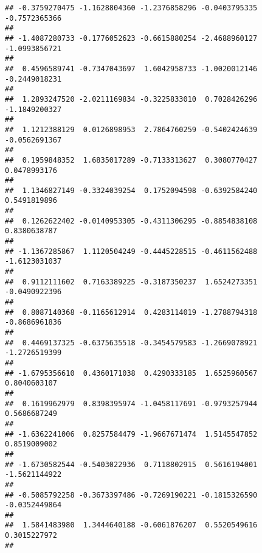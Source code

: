 \documentclass[]{article}
\begin{document}
\begin{verbatim}
## -0.3759270475 -1.1628804360 -1.2376858296 -0.0403795335 -0.7572365366 
##                                                                       
## -1.4087280733 -0.1776052623 -0.6615880254 -2.4688960127 -1.0993856721 
##                                                                       
##  0.4596589741 -0.7347043697  1.6042958733 -1.0020012146 -0.2449018231 
##                                                                       
##  1.2893247520 -2.0211169834 -0.3225833010  0.7028426296 -1.1849200327 
##                                                                       
##  1.1212388129  0.0126898953  2.7864760259 -0.5402424639 -0.0562691367 
##                                                                       
##  0.1959848352  1.6835017289 -0.7133313627  0.3080770427  0.0478993176 
##                                                                       
##  1.1346827149 -0.3324039254  0.1752094598 -0.6392584240  0.5491819896 
##                                                                       
##  0.1262622402 -0.0140953305 -0.4311306295 -0.8854838108  0.8380638787 
##                                                                       
## -1.1367285867  1.1120504249 -0.4445228515 -0.4611562488 -1.6123031037 
##                                                                       
##  0.9112111602  0.7163389225 -0.3187350237  1.6524273351 -0.0490922396 
##                                                                       
##  0.8087140368 -0.1165612914  0.4283114019 -1.2788794318 -0.8686961836 
##                                                                       
##  0.4469137325 -0.6375635518 -0.3454579583 -1.2669078921 -1.2726519399 
##                                                                       
## -1.6795356610  0.4360171038  0.4290333185  1.6525960567  0.8040603107 
##                                                                       
##  0.1619962979  0.8398395974 -1.0458117691 -0.9793257944  0.5686687249 
##                                                                       
## -1.6362241006  0.8257584479 -1.9667671474  1.5145547852  0.8519009002 
##                                                                       
## -1.6730582544 -0.5403022936  0.7118802915  0.5616194001 -1.5621144922 
##                                                                       
## -0.5085792258 -0.3673397486 -0.7269190221 -0.1815326590 -0.0352449864 
##                                                                       
##  1.5841483980  1.3444640188 -0.6061876207  0.5520549616  0.3015227972 
##                                                                       

\end{verbatim}
\end{document}
